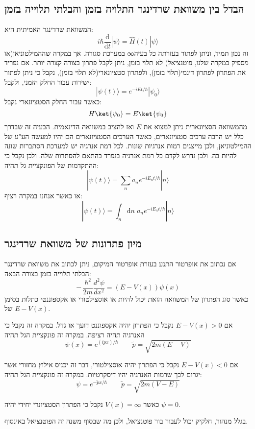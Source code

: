 \documentclass{tstextbook}
\begin{document}
\subsection{הבדל בין משוואת שרדינגר התלויה בזמן והבלתי תלוייה בזמן}

המשוואת שרדינגר האמיתית היא:
$$i\hbar{\frac{\mathrm{d}}{\mathrm{d}t}}|\psi\rangle={\hat{H}}(t)|\psi\rangle$$
זה נכון תמיד, וניתן לפתור בעזרתה כל בעיה∞ במערכת סגורה. אך במקרה שההמילטוניאן(או מספיק במקרה שלנו, פוטנציאל) לא תלוי בזמן, ניתן לקבל פתרון בצורה קצרה יותר. אם נפריד את הפתרון לפתרון דינמי(תלוי בזמן), ולפתרון סטציונארי(לא תלוי בזמן), נקבל כי ניתן לפתור ישירות עבור החלק הזמני, ולקבל:
$$|\psi(t)\rangle=e^{-i E t/\hbar}|\psi_{0}\rangle$$
כאשר עבור החלק הסטציונארי נקבל:
$$H\ket{\psi_{0}} =E\ket{\psi_{0}} $$
מהמשוואה הסציונארית ניתן למצוא את \(E\) ואז להציב במשוואה הדינאמית. הבעיה זה שבדרך כלל יש הרבה ערכים סטציונארים, כאשר הערכים הסטציונארים הם יהיו למעשה הע"ע של ההמילטוניאן, ולכן מייצגים רמות אנרגיות שונות. לכל רמת אנרגיה יש למערכת הסתברות שונה להיות בה. ולכן נדרש לקדם כל רמת אנרגיה בנפרד בהתאם להסתרות שלה. ולכן נקבל כי ההתקדמות של הפונקציית גל תהיה:
$$|\psi(t)\rangle=\sum_{n}a_{n}e^{-i E_{n}t/\hbar}|n\rangle$$
או כאשר אנחנו במקרה רציף:
$$|\psi(t)\rangle=\int_{n}\mathrm{d}n\;a_{n}e^{-i E_{n}t/\hbar}|n\rangle$$

\subsection{מיון פתרונות של משוואת שרדינגר}

אם נכתוב את אופרטור התנע בעזרת אופרטור המיקום, ניתן לכתוב את משוואת שרדינגר הבלתי תלוייה בזמן בצורה הבאה:
$$-\,\frac{\hbar^{2}}{2m}\frac{d^{2}\psi}{d x^{2}}=(E-V(x))\psi(x)$$
כאשר סוג הפתרון של המשוואה הזאת יכול להיות או אוסצילטורי או אקספוננטי כתלות בסימן של \(E-V(x)\).

\begin{proposition}
אם \(E-V(x)>0\) נקבל כי הפתרון יהיה אקספוננט דועך או גדל. במקרה זה נקבל כי האנרגיה תהיה רציפה. במקרה זה פונקציית הגל תהיה
$$\psi(x)=\mathrm{e}^{(i p x)/\hbar} \qquad \tilde{p}=\sqrt{2m(E-V)}$$

\end{proposition}
\begin{proposition}
אם \(E-V(x)<0\) נקבל כי הפתרון יהיה אוסצילטורי, דבר זה יכניס אילוץ מחזורי אשר יגרום לכך שרמות האנרגיה יהיו דיסקרטיות. במקרה זה פונקציית הגל תהיה:
$$\psi=e^{ -\tilde{p}x/\hbar }\qquad \tilde{p}=\sqrt{ 2m(V-E) }$$

\end{proposition}
\begin{proposition}
כאשר \(V(x)=\infty\) נקבל כי הפתרון הסטציונרי יחידי יהיה \(\psi=0\).

\end{proposition}
בגלל מנהור, חלקיק יכול לעבור בור פוטנציאל, ולכן מה שבסוף משנה זה הפוטנציאל באינסוף.
\end{document}
